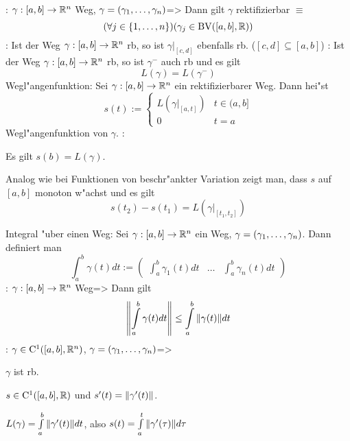 \theorem:
  $\gamma:[a,b]\to\mathbb R^n$ Weg, $\gamma=(\gamma_1,\ldots,\gamma_n)$=>{
  Dann gilt $\gamma$ rektifizierbar $\equiv$
  \[(\forall j\in\{1,\ldots,n\})(\gamma_j\in{\rm BV}([a,b],\mathbb R))
    \]
  }
\remark:{
  Ist der Weg $\gamma:[a,b]\to\mathbb R^n$ rb, so ist $\gamma|_{[c,d]}$ ebenfalls rb.
  ($[c,d]\subseteq [a,b]$)
  }
\remark:{
  Ist der Weg $\gamma:[a,b]\to\mathbb R^n$ rb, so ist $\gamma^-$ auch rb und es
  gilt
  \[L(\gamma)=L(\gamma^-)
    \]
  }
 Wegl"angenfunktion:{
  Sei $\gamma:[a,b]\to\mathbb R^n$ ein rektifizierbarer Weg. Dann hei"st
  \[s(t):=\begin{cases}
      L(\gamma|_{[a,t]}) & t\in (a,b] \\
      0 & t=a
      \end{cases}
    \]
  Wegl"angenfunktion von $\gamma$.
  }
\remark:{
  Es gilt $s(b)=L(\gamma)$.
  
  Analog wie bei Funktionen von beschr"ankter Variation zeigt man, dass $s$
  auf $[a,b]$ monoton w"achst und es gilt
  \[s(t_2)-s(t_1)=L(\gamma|_{[t_1,t_2]})
    \]
  }
 Integral "uber einen Weg:{
  Sei $\gamma:[a,b]\to\mathbb R^n$ ein Weg, $\gamma=(\gamma_1,\ldots,\gamma_n)$. 
  Dann definiert man
  \[\int_a^b \gamma(t) dt:=
      \begin{pmatrix}
        \int_a^b \gamma_1(t) dt & \ldots & \int_a^b \gamma_n(t) dt
        \end{pmatrix}
    \]
  }
\theorem:
  $\gamma:[a,b]\to\mathbb R^n$ Weg=>{
  Dann gilt
  \[\norm{\int_a^b \gamma(t) dt} \leq \int_a^b \norm{\gamma(t)} dt
    \]
  }
\theorem:
  $\gamma\in{\rm C}^1([a,b],\mathbb R^n)$, $\gamma=(\gamma_1,\ldots,\gamma_n)$=>{
  \begin{stmts}
    \item $\gamma$ ist rb.
    \item $s\in{\rm C}^1([a,b],\mathbb R)$ und $s'(t)={\left\| \gamma'(t)\right\|}$.
    \item $L(\gamma)=\int_a^b \norm{\gamma'(t)} dt $, also
      $s(t)=\int_a^t \norm{\gamma'(\tau)} d\tau$
    \end{stmts}
  }
